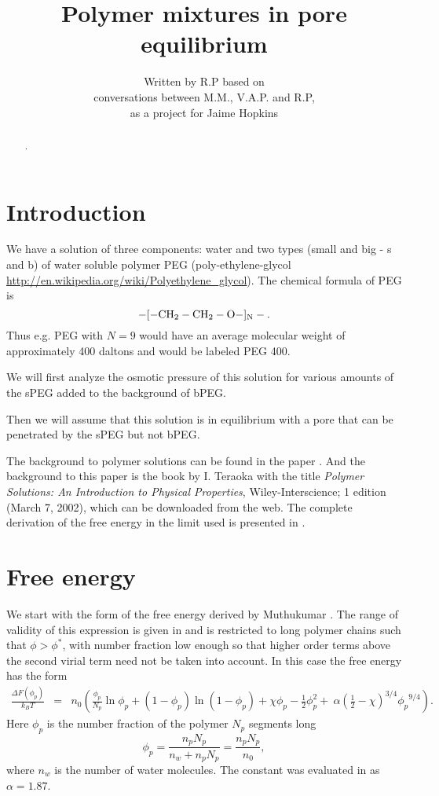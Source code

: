 \documentclass[11pt,a4paper]{article}
\begin{document}
\title{Polymer mixtures in pore equilibrium}
\author{Written by R.P based on \\
conversations between M.M., V.A.P. and R.P, \\
as a project for Jaime Hopkins}
\maketitle

\begin{abstract} 
.
\end{abstract}

\section{Introduction}

We have a solution of three components: water and two types (small and big - s and b) of water soluble polymer PEG (poly-ethylene-glycol \url{http://en.wikipedia.org/wiki/Polyethylene_glycol}). The chemical formula of PEG is $$\rm-[-CH_2-CH_2-O-]_N-.$$Thus e.g. PEG with $N=9$ would have an average molecular weight of approximately 400 daltons and would be labeled PEG 400. 

We will first analyze the osmotic pressure of this solution for various amounts of the sPEG added to the background of bPEG.

Then we will assume that this solution is in equilibrium with a pore that can be penetrated by the sPEG but not bPEG.

The background to polymer solutions can be found in the paper \cite{EOS}. And the background to this paper is the book by I. Teraoka with the title {\sl Polymer Solutions: An Introduction to Physical Properties}, Wiley-Interscience; 1 edition (March 7, 2002), which can be downloaded from the web. The complete derivation of the free energy in the limit used is presented in \cite{Muthu1,Muthu2}.

\section{Free energy}

We start with the form of the free energy derived by Muthukumar \cite{Muthu1}. The range of validity of this expression is given in \cite{Muthu1} and is restricted to long polymer chains such that $\phi > \phi^*$, with number fraction low enough so that higher order terms above the second virial term need not be taken into account. In this case the free energy has the form
\begin{eqnarray}
\frac{\Delta F(\phi_p)}{k_B T} &=& n_0 \left( \frac{\phi_p}{N_p}  \ln{\phi_p} + (1-\phi_p) \ln{(1-\phi_p)}  + \chi \phi_p - 
{\textstyle\frac12} \phi_p^{2} + ~\alpha  \left( {\textstyle\frac12} - \chi\right)^{3/4} {\phi_p}^{9/4}\right).
\label{ansatz1}
\end{eqnarray}
Here $\phi_p$ is the number fraction of the polymer $N_p$ segments long $$\phi_p = \frac{n_p N_p}{n_w + n_pN_p} = \frac{n_p N_p}{n_0},$$where $n_w$ is the number of water molecules. The constant was evaluated in \cite{Muthu1} as $\alpha = 1.87$.
\end{document}
